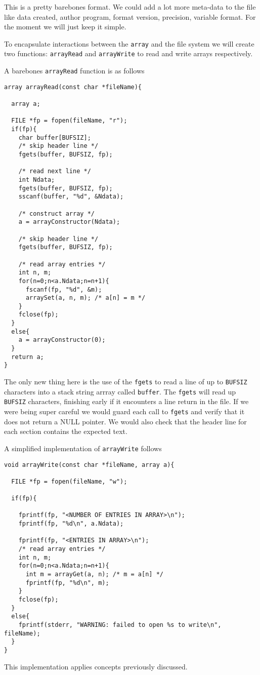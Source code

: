 This is a pretty barebones format. We could add a lot more meta-data to the file like data created, author program, format version, precision, variable format. For the moment we will just keep it simple.

To encapsulate interactions between the \texttt{array} and the file system we will create two functions: \texttt{arrayRead} and \texttt{arrayWrite} to read and write arrays respectively.

A barebones \texttt{arrayRead} function is as follows

\begin{verbatim}
array arrayRead(const char *fileName){

  array a;

  FILE *fp = fopen(fileName, "r");
  if(fp){
    char buffer[BUFSIZ];
    /* skip header line */
    fgets(buffer, BUFSIZ, fp);

    /* read next line */
    int Ndata;
    fgets(buffer, BUFSIZ, fp);
    sscanf(buffer, "%d", &Ndata);

    /* construct array */
    a = arrayConstructor(Ndata);

    /* skip header line */
    fgets(buffer, BUFSIZ, fp);

    /* read array entries */
    int n, m;
    for(n=0;n<a.Ndata;n=n+1){
      fscanf(fp, "%d", &m);
      arraySet(a, n, m); /* a[n] = m */
    }
    fclose(fp);
  }
  else{
    a = arrayConstructor(0);
  }
  return a;
}
\end{verbatim}
The only new thing here is the use of the \texttt{fgets} to read a line of up to \texttt{BUFSIZ} characters into a stack string arrray called \texttt{buffer}. The \texttt{fgets} will read up \texttt{BUFSIZ} characters, finishing early if it encounters a line return in the file. If we were being super careful we would guard each call to \texttt{fgets} and verify that it does not return a NULL pointer. We would also check that the header line for each section contains the expected text.

A simplified implementation of \texttt{arrayWrite} follows

\begin{verbatim}
void arrayWrite(const char *fileName, array a){

  FILE *fp = fopen(fileName, "w");

  if(fp){

    fprintf(fp, "<NUMBER OF ENTRIES IN ARRAY>\n");
    fprintf(fp, "%d\n", a.Ndata);

    fprintf(fp, "<ENTRIES IN ARRAY>\n");
    /* read array entries */
    int n, m;
    for(n=0;n<a.Ndata;n=n+1){
      int m = arrayGet(a, n); /* m = a[n] */
      fprintf(fp, "%d\n", m);
    }
    fclose(fp);
  }
  else{
    fprintf(stderr, "WARNING: failed to open %s to write\n", fileName);
  }
}
\end{verbatim}
This implementation applies concepts previously discussed. 

